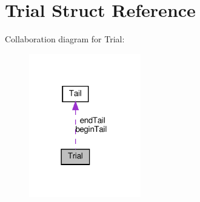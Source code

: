 \hypertarget{structTrial}{}\section{Trial Struct Reference}
\label{structTrial}


Collaboration diagram for Trial\+:\nopagebreak
\begin{figure}[H]
\begin{center}
\leavevmode
\includegraphics[width=138pt]{structTrial__coll__graph}
\end{center}
\end{figure}
